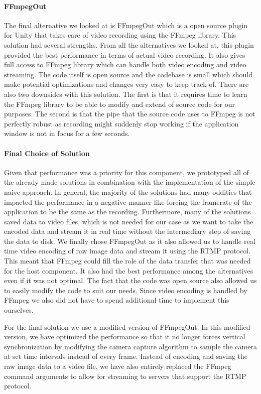 \paragraph{FFmpegOut}
The final alternative we looked at is FFmpegOut\cite{ffmpegOut} which is a open source plugin for Unity that takes care of video recording using the FFmpeg\cite{ffmpeg} library. This solution had several strengths. From all the alternatives we looked at, this plugin provided the best performance in terms of actual video recording. It also gives full access to FFmpeg library which can handle both video encoding and video streaming. The code itself is open source and the codebase is small which should make potential optimizations and changes very easy to keep track of. There are also two downsides with this solution. The first is that it requires time to learn the FFmpeg library to be able to modify and extend of source code for our purposes. The second is that the pipe that the source code uses to FFmpeg is not perfectly robust as recording might suddenly stop working if the application window is not in focus for a few seconds.  

\paragraph{Final Choice of Solution}
Given that performance was a priority for this component, we prototyped all of the already made solutions in combination with the implementation of the simple naive approach. In general, the majority of the solutions had many oddities that impacted the performance in a negative manner like forcing the framerate of the application to be the same as the recording. Furthermore, many of the solutions saved data to video files, which is not needed for our case as we want to take the encoded data and stream it in real time without the intermediary step of saving the data to disk. We finally chose FFmpegOut as it also allowed us to handle real time video encoding of raw image data and stream it using the RTMP protocol. This meant that FFmpeg could fill the role of the data transfer that was needed for the host component. It also had the best performance among the alternatives even if it was not optimal. The fact that the code was open source also allowed us to easily modify the code to suit our needs. Since video encoding is handled by FFmpeg we also did not have to spend additional time to implement this ourselves. 

For the final solution we use a modified version of FFmpegOut. In this modified version, we have optimized the performance so that it no longer forces vertical synchronization by modifying the camera capture algorithm to sample the camera at set time intervals instead of every frame. Instead of encoding and saving the raw image data to a video file, we have also entirely replaced the FFmpeg command arguments to allow for streaming to servers that support the RTMP protocol. 
    

